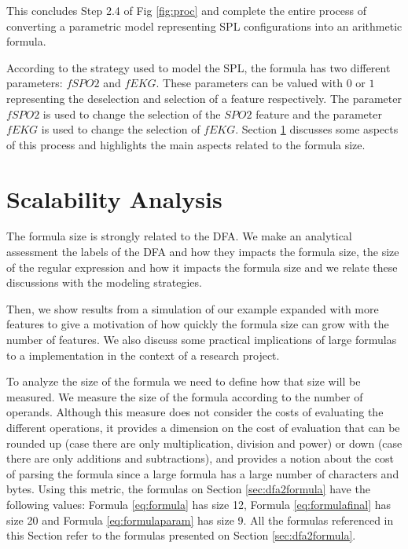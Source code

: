 \documentclass[conference]{IEEEtran}
\begin{document}
	
	This concludes Step 2.4 of Fig 
	\ref{fig:proc} and complete the entire process of converting a parametric model
	representing SPL configurations into an arithmetic formula.
	
	According to the strategy used to model the SPL, the formula
	has  two different parameters: $fSPO2$ and $fEKG$. These
	parameters can be valued with $0$ or $1$ representing the
	deselection and selection of a feature respectively. The 
	parameter $fSPO2$ is used to change the selection of the $SPO2$ feature
	and the parameter $fEKG$ is used to change the selection of $fEKG$. Section \ref{sec:processanalysis} discusses some aspects of this process
	and highlights the main aspects related to the formula size.
			
	
\section{Scalability Analysis}
\label{sec:processanalysis}	

		The formula size is strongly related to the DFA. 
	We make an analytical assessment the labels of the DFA and how they impacts the formula size,
	the size of the regular expression and how it impacts
	the formula size and we relate these discussions with the modeling strategies.
		
	Then, we show 
	results from a simulation of our example expanded with more features to
	give a motivation of how quickly the formula size can grow with the number
	of features. We also discuss some practical implications of large formulas to
	a implementation in the context of a research project.

	  To analyze the size of the formula we need to define how that size will be measured.
	We measure the size of the formula according to the number of operands. Although this measure
	does not consider the costs of evaluating the different operations, it provides a dimension
	on the cost of evaluation that can be rounded up (case there are only multiplication, division and power)
	or down (case there are only additions and subtractions),  and provides a notion about
	the cost of parsing the formula since a large formula has a large number of characters and bytes.
	 Using this metric, the formulas on Section \ref{sec:dfa2formula}
	have the following values:	Formula \ref{eq:formula} has size 12, Formula \ref{eq:formulafinal} has size 20
	and Formula \ref{eq:formulaparam} has size 9. All the formulas referenced in this Section refer to the formulas
	presented on Section  \ref{sec:dfa2formula}.
								
\end{document}
